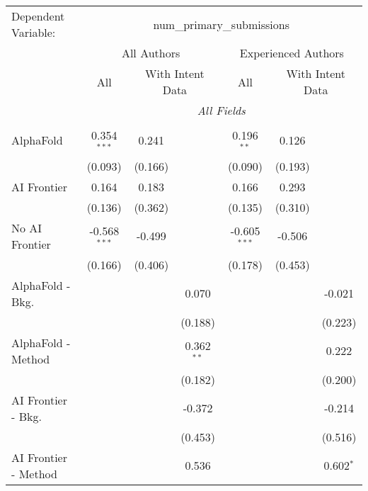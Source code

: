\begingroup
\centering
\begin{tabular}{lcccccc}
   \tabularnewline \midrule \midrule
   Dependent Variable: & \multicolumn{6}{c}{num\_primary\_submissions}\\
 & \multicolumn{3}{c}{All Authors} & \multicolumn{3}{c}{Experienced Authors} \\
\cmidrule(lr){2-4} \cmidrule(lr){5-7}
 & \multicolumn{1}{c}{All} & \multicolumn{2}{c}{With Intent Data} & \multicolumn{1}{c}{All} & \multicolumn{2}{c}{With Intent Data} \\
\cmidrule(lr){2-2} \cmidrule(lr){3-4} \cmidrule(lr){5-5} \cmidrule(lr){6-7}
 & \multicolumn{6}{c}{\textit{All Fields}} \\ \\
   AlphaFold               & 0.354$^{***}$  & 0.241   &               & 0.196$^{**}$   & 0.126   &   \\   
                           & (0.093)        & (0.166) &               & (0.090)        & (0.193) &   \\   
   AI Frontier             & 0.164          & 0.183   &               & 0.166          & 0.293   &   \\   
                           & (0.136)        & (0.362) &               & (0.135)        & (0.310) &   \\   
   No AI Frontier          & -0.568$^{***}$ & -0.499  &               & -0.605$^{***}$ & -0.506  &   \\   
                           & (0.166)        & (0.406) &               & (0.178)        & (0.453) &   \\   
   AlphaFold - Bkg.        &                &         & 0.070         &                &         & -0.021\\   
                           &                &         & (0.188)       &                &         & (0.223)\\   
   AlphaFold - Method      &                &         & 0.362$^{**}$  &                &         & 0.222\\   
                           &                &         & (0.182)       &                &         & (0.200)\\   
   AI Frontier - Bkg.      &                &         & -0.372        &                &         & -0.214\\   
                           &                &         & (0.453)       &                &         & (0.516)\\   
   AI Frontier - Method    &                &         & 0.536         &                &         & 0.602$^{*}$\\   

\end{tabular}
